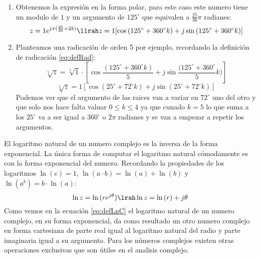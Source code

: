     \begin{enumerate}
        \item Obtenemos la expresión en la forma polar, para este caso este numero tiene un modulo de $1$ y un argumento de $125^{\circ}$ que equivalen a $\frac{25}{36}\pi$ radianes:
        \begin{equation}
         z= 1e^{j\pi(\frac{25}{36}+2k)} \llrah z = 1[\cos{(125^{\circ} + 360^{\circ} k)}+j\sin{(125^{\circ} + 360^{\circ} k)}]
        \end{equation}
        \item Planteamos una radicación de orden 5 por ejemplo, recordando la definición de radicación \ref{eq:defRad}:
        \begin{equation}
            \sqrt[5]{z}=\sqrt[5]{1} \cdot [\cos{\frac{(125^{\circ} + 360^{\circ} k)}{5}}+j\sin{\frac{(125^{\circ} + 360^{\circ}}{5} k)}]
        \end{equation}
        \begin{equation}\label{eq:RadCej} 
            \sqrt[5]{z}=1[\cos{(25^{\circ} + 72^{\circ} k)}+j\sin{(25^{\circ} + 72^{\circ}k)}]
        \end{equation}
        Podemos ver que el argumento de las raices van a variar en $72^{\circ}$ uno del otro y que solo nos hace falta valuar $0\leqslant k \leqslant 4$ ya que cunado $k=5$ lo que suma a los $25^{\circ}$ va a ser igual a $360^{\circ}$ o 
 $2\pi$ radianes y se van a empezar a repetir los argumentos.
    \end{enumerate}
\begin{figure}[H]
    \centering
    
    \label{fig:RadC}
\end{figure}
El logaritmo natural de un numero complejo es la inversa de la forma exponencial. La única forma de computar el logaritmo natural cómodamente es con la forma exponencial del numero. Recordando la propiedades de los logaritmos $\ln{(e)}=1$, $\ln{(a\cdot b)}=\ln{(a)}+\ln{(b)}$ y $\ln{(a^b)}=b\cdot \ln{(a)}$:
\begin{equation} \label{eq:defLnC}
    \ln{z}=\ln{(re^{j\theta})}\lrah \ln{z}=\ln{(r)}+j\theta
\end{equation}
Como vemos en la ecuación \ref{eq:defLnC} el logaritmo natural de un numero complejo, en su forma exponencial, da como resultado un otro numero complejo en forma cartesiana de parte real igual al logaritmo natural del radio y parte imaginaria igual a su argumento.
Para los números complejos existen otras operaciones exclusivas que son útiles en el analisis complejo.
